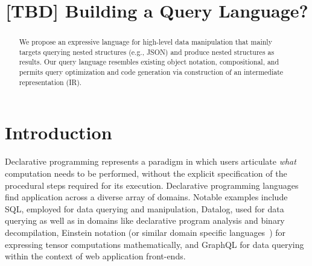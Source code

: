 \documentclass[runningheads]{llncs}
\begin{document}
%
\title{[TBD] Building a Query Language?}

%
%
%
\maketitle              %
%
\begin{abstract}
We propose an expressive language for high-level data manipulation that
mainly targets querying nested structures (e.g., JSON) and produce nested
structures as results.
Our query language resembles existing object notation, compositional, and
permits query optimization and code generation via construction of an
intermediate representation (IR).


\end{abstract}
%
%
%
\section{Introduction}


Declarative programming represents a paradigm in which users articulate \emph{what}
computation needs to be performed, without the explicit specification of the
procedural steps required for its execution.
Declarative programming languages find application across a diverse array of
domains.
Notable examples include SQL, employed for data querying and manipulation,
Datalog, used for data querying as well as in domains like declarative program
analysis and binary decompilation, Einstein notation (or similar domain
specific languages~\cite{tensor_comprehensions}) for expressing tensor computations
mathematically, and GraphQL for data querying within the context of web application
front-ends.
\end{document}
